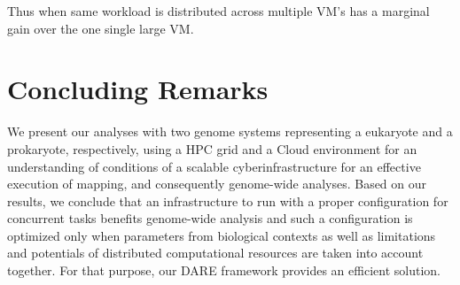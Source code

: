\documentclass{acm_proc_article-sp}
\begin{document}
Thus when same workload is distributed across multiple VM's has a marginal gain over the one single large VM.


\section{Concluding Remarks}
We present our analyses with two genome systems representing a eukaryote and a prokaryote, respectively, using
 a HPC grid and a Cloud environment for an understanding of conditions of a scalable cyberinfrastructure for an effective execution of
 mapping, and consequently genome-wide analyses.   Based on our results, we conclude that an infrastructure to run with a proper configuration for concurrent tasks benefits genome-wide analysis and such a configuration is optimized only when parameters from biological contexts as well as limitations and potentials of distributed computational resources are taken into account together.  For that purpose, our DARE framework provides an efficient solution.  





\end{document}
